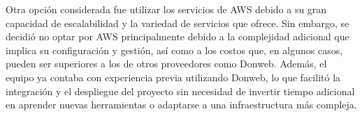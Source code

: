 
Otra opción considerada fue utilizar los servicios de AWS \citep{AWSWebsite} debido a su gran capacidad de escalabilidad y la variedad de servicios que ofrece. Sin embargo, se decidió no optar por AWS principalmente debido a la complejidad adicional que implica su configuración y gestión, así como a los costos que, en algunos casos, pueden ser superiores a los de otros proveedores como Donweb. Además, el equipo ya contaba con experiencia previa utilizando Donweb, lo que facilitó la integración y el despliegue del proyecto sin necesidad de invertir tiempo adicional en aprender nuevas herramientas o adaptarse a una infraestructura más compleja.








